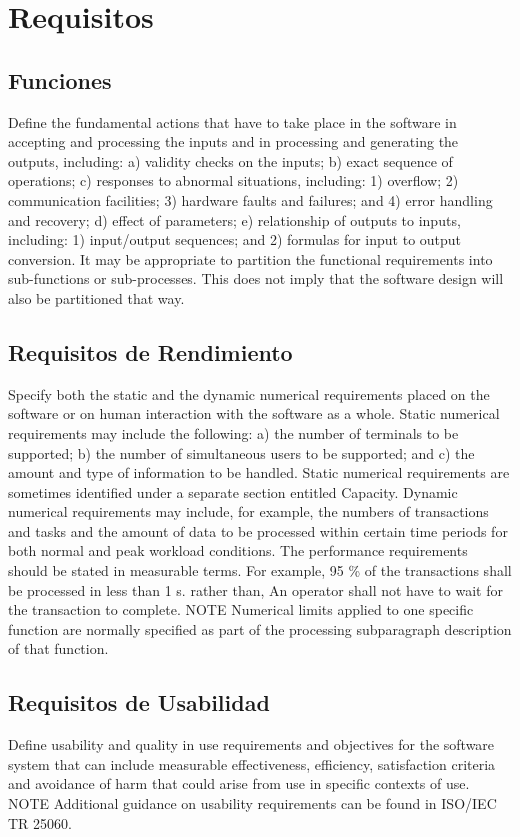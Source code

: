 \documentclass[12pt, a4paper, twoside]{article}
\begin{document}
\section{Requisitos}
\subsection{Funciones}
Define the fundamental actions that have to take place in the software in accepting and processing the
inputs and in processing and generating the outputs, including:
a) validity checks on the inputs;
b) exact sequence of operations;
c) responses to abnormal situations, including:
1) overflow;
2) communication facilities;
3) hardware faults and failures; and
4) error handling and recovery;
d) effect of parameters;
e) relationship of outputs to inputs, including:
1) input/output sequences; and
2) formulas for input to output conversion.
It may be appropriate to partition the functional requirements into sub-functions or sub-processes.
This does not imply that the software design will also be partitioned that way.

\subsection{Requisitos de Rendimiento}
Specify both the static and the dynamic numerical requirements placed on the software or on human
interaction with the software as a whole.
Static numerical requirements may include the following:
a) the number of terminals to be supported;
b) the number of simultaneous users to be supported; and
c) the amount and type of information to be handled.
Static numerical requirements are sometimes identified under a separate section entitled Capacity.
Dynamic numerical requirements may include, for example, the numbers of transactions and tasks and
the amount of data to be processed within certain time periods for both normal and peak workload
conditions.
The performance requirements should be stated in measurable terms.
For example,
95 \% of the transactions shall be processed in less than 1 s.
rather than,
An operator shall not have to wait for the transaction to complete.
NOTE Numerical limits applied to one specific function are normally specified as part of the processing
subparagraph description of that function.

\subsection{Requisitos de Usabilidad}
Define usability and quality in use requirements and objectives for the software system that can include
measurable effectiveness, efficiency, satisfaction criteria and avoidance of harm that could arise from
use in specific contexts of use.
NOTE Additional guidance on usability requirements can be found in ISO/IEC TR 25060.
\end{document}

